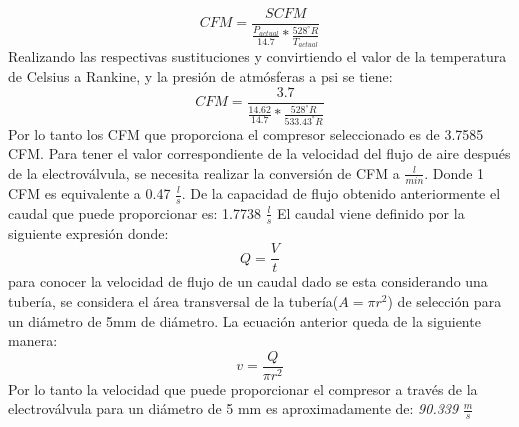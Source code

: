 \begin{equation}
	CFM=\frac{SCFM}{\frac{P_{actual}}{14.7}*\frac{528^\circ R}{T_{actual}}}
\end{equation}
Realizando las respectivas sustituciones y convirtiendo el valor de la temperatura de Celsius a  Rankine, y la presi\'on de atmósferas a psi se tiene:
\begin{equation}
	CFM=\frac{3.7}{\frac{14.62}{14.7}*\frac{528^\circ R}{533.43^\circ R}}
\end{equation}
Por lo tanto los CFM que proporciona el compresor seleccionado es de 3.7585 CFM.
\newline
Para tener el valor correspondiente de la velocidad del flujo de aire después de la electrov\'alvula, se necesita realizar la conversión de CFM a $\frac{l}{min}$. Donde 1 CFM es equivalente a 0.47 $\frac{l}{s}$. De la capacidad de flujo obtenido anteriormente el caudal que puede proporcionar es: 1.7738 $\frac{l}{s}$
\newline
El caudal viene definido por la siguiente expresi\'on donde:
\begin{equation}
	Q=\frac{V}{t}
\end{equation}
para conocer la velocidad de flujo de un caudal dado se esta considerando una tubería, se considera el área transversal de la tubería($A=\pi r^2$) de selección para un diámetro de 5mm de diámetro. 
\newline
La ecuación anterior queda de la siguiente manera: 
\begin{equation}
	v=\frac{Q}{\pi r^2}
\end{equation}
Por lo tanto la velocidad que puede proporcionar el compresor a través de la electrov\'alvula para un diámetro de 5 mm es aproximadamente de: \textit {90.339} $\frac{m}{s}$\cite{Atlas2014}